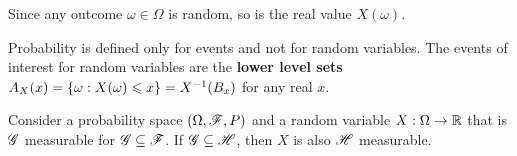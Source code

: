 \documentclass[letterpaper,10pt,english]{article}
\begin{document}
\begin{rem} 
Since any outcome $\omega \in \Omega$ is random, so is the real value $X(\omega)$. %
\end{rem}
\begin{rem}
Probability is defined only for events and not for random variables. 
The events of interest for random variables are the \textbf{lower level sets} $A_X(x) = \left\{\omega: X(\omega) \leqslant x\right\} = X^{-1}(B_x)$ for any real $x$. %
\end{rem}
\begin{rem}
Consider a probability space $(\Omega,\mathscr{F},P)$ and a random variable $X:\Omega \to \mathbb{R}$ that is $\mathscr{G}$ measurable for $\mathscr{G} \subseteq \mathscr{F}$. 
If $\mathscr{G} \subseteq \mathscr{H}$, then $X$ is also $\mathscr{H}$ measurable.
\end{rem}
\end{document}
